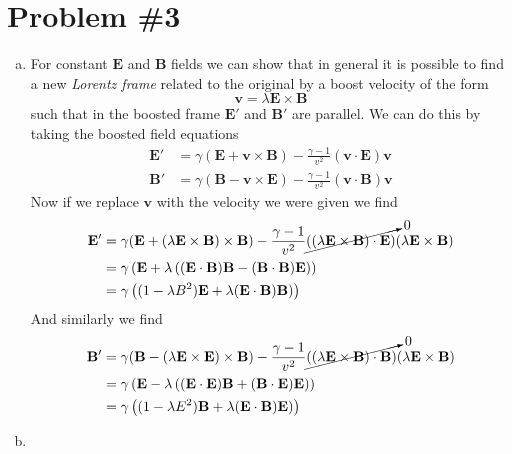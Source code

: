 \documentclass[11pt]{article}
\numberwithin{equation}{section}
\begin{document}
\section{Problem \#3}
\begin{enumerate}[(a)]
\item
    For constant $\mathbf{E}$ and $\mathbf{B}$ fields we can show that in general it is possible to find a new
    \emph{Lorentz frame} related to the original by a boost velocity of the form
    $$\mathbf{v} = \lambda\mathbf{E}\times\mathbf{B}$$
    such that in the boosted frame $\mathbf{E}'$ and $\mathbf{B}'$ are parallel. We can do this by taking the boosted
    field equations 
    \begin{align*}
        \mathbf{E}' &= \gamma(\mathbf{E}+\mathbf{v}\times\mathbf{B}) - \frac{\gamma-1}{v^2}(\mathbf{v}\cdot\mathbf{E})\mathbf{v}\\
        \mathbf{B}' &= \gamma(\mathbf{B}-\mathbf{v}\times\mathbf{E}) - \frac{\gamma-1}{v^2}(\mathbf{v}\cdot\mathbf{B})\mathbf{v}
    \end{align*}
    Now if we replace $\mathbf{v}$ with the velocity we were given we find
    \begin{align*}
        \mathbf{E}' &= \gamma(\mathbf{E}+(\lambda\mathbf{E}\times\mathbf{B})\times\mathbf{B}) - \frac{\gamma-1}{v^2}\cancelto{0}{((\lambda\mathbf{E}\times\mathbf{B})\cdot\mathbf{E})}(\lambda\mathbf{E}\times\mathbf{B})\\
                    &= \gamma\left(\mathbf{E} + \lambda\left((\mathbf{E}\cdot\mathbf{B})\mathbf{B}-(\mathbf{B}\cdot\mathbf{B})\mathbf{E}\right)\right)\\
                    &= \gamma\left((1-\lambda{B^2})\mathbf{E} + \lambda(\mathbf{E}\cdot\mathbf{B})\mathbf{B})\right)
    \end{align*}
    And similarly we find
    \begin{align*}
        \mathbf{B}' &= \gamma(\mathbf{B}-(\lambda\mathbf{E}\times\mathbf{E})\times\mathbf{B}) - \frac{\gamma-1}{v^2}\cancelto{0}{((\lambda\mathbf{E}\times\mathbf{B})\cdot\mathbf{B})}(\lambda\mathbf{E}\times\mathbf{B})\\
                    &= \gamma\left(\mathbf{E} - \lambda\left((\mathbf{E}\cdot\mathbf{E})\mathbf{B}+(\mathbf{B}\cdot\mathbf{E})\mathbf{E}\right)\right)\\
                    &= \gamma\left((1-\lambda{E^2})\mathbf{B} + \lambda(\mathbf{E}\cdot\mathbf{B})\mathbf{E})\right)
    \end{align*}



\item
\end{enumerate}
\end{document}
